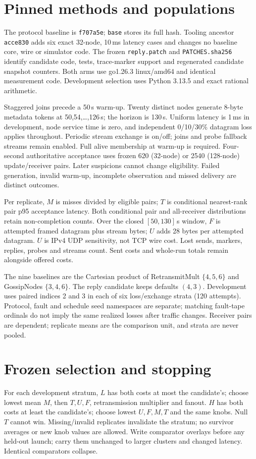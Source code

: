 \documentclass[10pt]{article}
\begin{document}
\section{Pinned methods and populations}
The protocol baseline is \texttt{f707a5e}; \texttt{base} stores its full hash.
Tooling ancestor \texttt{acce830} adds six exact 32-node, 10\,ms latency
cases and changes no baseline core, wire or simulator code. The frozen
\texttt{reply.patch} and \texttt{PATCHES.sha256} identify candidate code,
tests, trace-marker support and regenerated candidate snapshot counters.
Both arms use go1.26.3 linux/amd64 and identical measurement code.
Development selection uses Python 3.13.5 and exact rational arithmetic.

Staggered joins precede a 50\,s warm-up. Twenty distinct nodes generate
8-byte metadata tokens at 50,54,\ldots,126\,s; the horizon is 130\,s. Uniform
latency is 1\,ms in development, node service time is zero, and independent
0/10/30\% datagram loss applies throughout. Periodic stream exchange is
on/off; joins and probe fallback streams remain enabled. Full alive
membership at warm-up is required. Four-second authoritative acceptance
uses frozen 620 (32-node) or 2540 (128-node) update/receiver pairs. Later
suspicions cannot change eligibility. Failed generation, invalid warm-up,
incomplete observation and missed delivery are distinct outcomes.

Per replicate, $M$ is misses divided by eligible pairs; $T$ is conditional
nearest-rank pair p95 acceptance latency. Both conditional pair and
all-receiver distributions retain non-completion counts. Over the closed
$[50,130]$\,s window, $F$ is attempted framed datagram plus stream bytes;
$U$ adds 28 bytes per attempted datagram. $U$ is IPv4 UDP sensitivity,
not TCP wire cost. Lost sends, markers, replies, probes and streams count.
Sent costs and whole-run totals remain alongside offered costs.

The nine baselines are the Cartesian product of RetransmitMult
$\{4,5,6\}$ and GossipNodes $\{3,4,6\}$. The reply candidate keeps defaults
$(4,3)$. Development uses paired indices 2 and 3 in each of six
loss/exchange strata (120 attempts). Protocol, fault and schedule seed
namespaces are separate; matching fault-tape ordinals do not imply the
same realized losses after traffic changes. Receiver pairs are dependent;
replicate means are the comparison unit, and strata are never pooled.

\section{Frozen selection and stopping}
For each development stratum, $L$ has both costs at most the candidate's;
choose lowest mean $M$, then $T,U,F$, retransmission multiplier and fanout.
$H$ has both costs at least the candidate's; choose lowest $U,F,M,T$ and
the same knobs. Null $T$ cannot win. Missing/invalid replicates invalidate
the stratum; no survivor averages or new knob values are allowed. Write
comparator overlays before any held-out launch; carry them unchanged to
larger clusters and changed latency. Identical comparators collapse.
\end{document}
